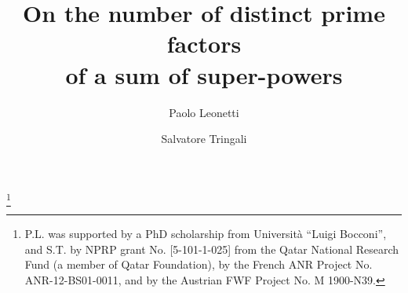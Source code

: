 \documentclass[reqno]{amsart}
\theoremstyle{remark}
\begin{document}
\title{On the number of distinct prime factors \\ of a sum of super-powers}

\author{Paolo Leonetti}
\address{Department of Decision Sciences, Universit\`a L. Bocconi, via Roentgen 1, 20136 Milano, Italy}%

\author{Salvatore Tringali}
\address{Department of Mathematics, Texas A\&M University at Qatar \\ PO Box 23874 Doha, Qatar}




\thanks{P.L. was supported by a PhD scholarship from Universit\`a ``Luigi Bocconi'', and S.T. by NPRP grant No. [5-101-1-025] from the Qatar National Research Fund (a member of Qatar Foundation), by the French ANR Project No. ANR-12-BS01-0011, and by the Austrian FWF Project No. M 1900-N39.}
\end{document}
